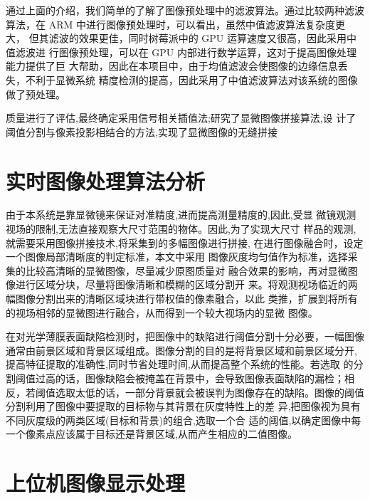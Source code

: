 通过上面的介绍，我们简单的了解了图像预处理中的滤波算法。通过比较两种滤波算法，在 ARM 中进行图像预处理时，可以看出，虽然中值滤波算法复杂度更大， 但其滤波的效果更佳，同时树莓派中的 GPU 运算速度又很高，因此采用中值滤波进 行图像预处理，可以在 GPU 内部进行数学运算，这对于提高图像处理能力提供了巨 大帮助，因此在本项目中，由于均值滤波会使图像的边缘信息丢失，不利于显微系统 精度检测的提高，因此采用了中值滤波算法对该系统的图像做了预处理。




质量进行了评估,最终确定采用信号相关插值法;研究了显微图像拼接算法,设
计了阈值分割与像素投影相结合的方法,实现了显微图像的无缝拼接
\section{实时图像处理算法分析}
由于本系统是靠显微镜来保证对准精度,进而提高测量精度的,因此,受显
微镜观测视场的限制,无法直接观察大尺寸范围的物体。因此,为了实现大尺寸
样品的观测,就需要采用图像拼接技术,将采集到的多幅图像进行拼接,
在进行图像融合时，设定一个图像局部清晰度的判定标准，本文中采用 图像灰度均匀值作为标准，选择采集的比较高清晰的显微图像，尽量减少原图质量对 融合效果的影响，再对显微图像进行区域分块，尽量将图像清晰和模糊的区域分割开 来。将观测视场临近的两幅图像分割出来的清晰区域块进行带权值的像素融合，以此 类推，扩展到将所有的视场相邻的显微图进行融合，从而得到一个较大视场内的显微 图像。 

在对光学薄膜表面缺陷检测时，把图像中的缺陷进行阈值分割十分必要，一幅图像通常由前景区域和背景区域组成。图像分割的目的是将背景区域和前景区域分开,提高特征提取的准确性,同时节省处理时间,从而提高整个系统的性能。若选取
的分割阈值过高的话，图像缺陷会被掩盖在背景中，会导致图像表面缺陷的漏检；相 反，若阈值选取太低的话，一部分背景就会被误判为图像存在的缺陷。图像的阈值分割利用了图像中要提取的目标物与其背景在灰度特性上的差
异,把图像视为具有不同灰度级的两类区域(目标和背景)的组合,选取一个合
适的阈值,以确定图像中每一个像素点应该属于目标还是背景区域,从而产生相应的二值图像。



\section{上位机图像显示处理}


